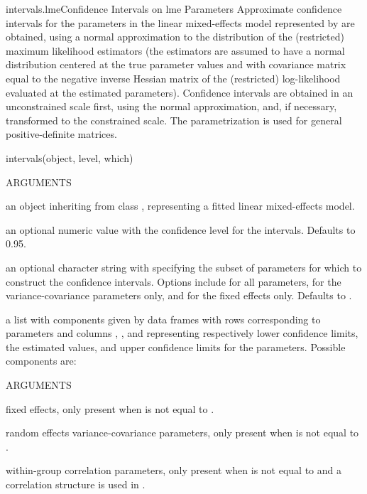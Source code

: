 \documentclass[pdftex]{article} \usepackage{url,graphicx}
\begin{document}
\begin{Helpfile}{intervals.lme}{Confidence Intervals on lme Parameters}
Approximate confidence intervals for the parameters in the linear
mixed-effects model represented by  are obtained, using
a normal approximation to the distribution of the (restricted)
maximum likelihood estimators (the estimators are assumed to have a
normal distribution centered at the true parameter values and with
covariance matrix equal to the negative inverse Hessian matrix of the
(restricted) log-likelihood evaluated at the estimated parameters).
Confidence intervals are obtained in an unconstrained scale first,
using the normal approximation, and, if necessary, transformed to the
constrained scale. The  parametrization is used for
general positive-definite matrices.
\begin{Example}
intervals(object, level, which)
\end{Example}
\begin{Argument}{ARGUMENTS}
\item[\Co{object:}]
an object inheriting from class , representing
a fitted linear mixed-effects model.
\item[\Co{level:}]
an optional numeric value with the confidence level for
the intervals. Defaults to 0.95.
\item[\Co{which:}]
an optional character string with specifying the  subset
of parameters for which to construct the confidence
intervals. Options include  for all parameters,
 for the variance-covariance parameters only, and
 for the fixed effects only. Defaults to .
\end{Argument}
a list with components given by data frames with rows corresponding to
parameters and columns , , and 
representing respectively lower confidence limits, the estimated
values, and upper confidence limits for the parameters. Possible
components are:
\begin{Argument}{ARGUMENTS}
\item[\Co{fixed:}]
fixed effects, only present when  is not
equal to .
\item[\Co{reStruct:}]
random effects variance-covariance parameters, only
present when  is not equal to .
\item[\Co{corStruct:}]
within-group correlation parameters, only
present when  is not equal to  and a
correlation structure is used in .

\end{Argument}
\end{Helpfile}
\end{document}
